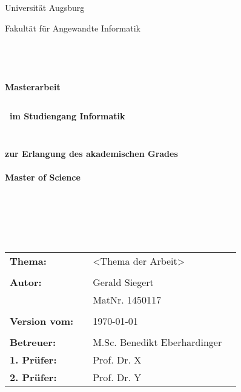 \thispagestyle{empty}

\begin{figure}[t]
\centering
~~~~~~~~~~
\end{figure}


\begin{verbatim}


\end{verbatim}

\begin{center}
\Large{Universität Augsburg}\\
\end{center}


\begin{center}
\Large{Fakultät für Angewandte Informatik}
\end{center}
\begin{verbatim}




\end{verbatim}
\begin{center}
\doublespacing
\textbf{\LARGE{Masterarbeit}}\\
\singlespacing
\begin{verbatim}

\end{verbatim}
\textbf{{~im Studiengang Informatik~}}
\end{center}
\begin{verbatim}

\end{verbatim}
\begin{center}

\end{center}
\begin{verbatim}

\end{verbatim}
\begin{center}
\textbf{zur Erlangung des akademischen Grades \\\ \\ Master of Science}
\end{center}
\begin{verbatim}






\end{verbatim}
\begin{flushleft}
\begin{tabular}{llll}
\textbf{Thema:} & & <Thema der Arbeit> & \\
& & \\
\textbf{Autor:} & & Gerald Siegert & \\
& & MatNr. 1450117 & \\
& & \\
\textbf{Version vom:} & & \today &\\
& & \\
\textbf{Betreuer:} & & M.Sc. Benedikt Eberhardinger &\\
\textbf{1. Prüfer:} & & Prof. Dr. X &\\
\textbf{2. Prüfer:} & & Prof. Dr. Y &\\
\end{tabular}
\end{flushleft}